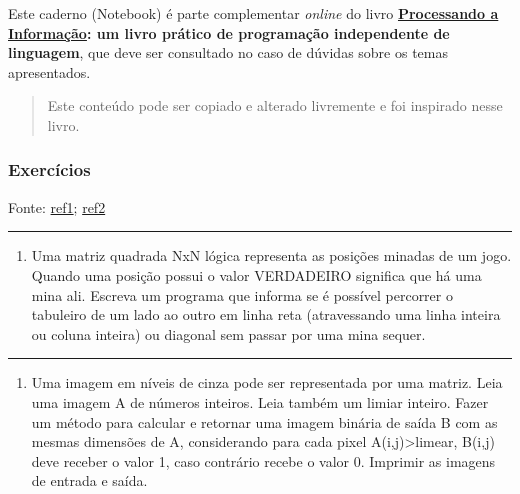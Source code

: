 \documentclass[12pt,a4paper]{article}
\providecommand{\tightlist}{%
      \setlength{\itemsep}{0pt}\setlength{\parskip}{0pt}}
\begin{document}
Este caderno (Notebook) é parte complementar \emph{online} do livro
\textbf{\href{https://editora.ufabc.edu.br/matematica-e-ciencias-da-computacao/58-processando-a-informacao}{Processando
a Informação}: um livro prático de programação independente de
linguagem}, que deve ser consultado no caso de dúvidas sobre os temas
apresentados.

\begin{quote}
Este conteúdo pode ser copiado e alterado livremente e foi inspirado
nesse livro.
\end{quote}

    \hypertarget{exercuxedcios}{%
\subsubsection{Exercícios}\label{exercuxedcios}}

Fonte:
\href{http://www.deinf.ufma.br/~csalles/prog/prog_lista2.pdf}{ref1};
\href{http://www.facom.ufu.br/~backes/wordpress/ListaC04.pdf}{ref2}

    \begin{center}\rule{0.5\linewidth}{0.5pt}\end{center}

\begin{enumerate}
\def\labelenumi{\arabic{enumi}.}
\tightlist
\item
  Uma matriz quadrada NxN lógica representa as posições minadas de um
  jogo. Quando uma posição possui o valor VERDADEIRO significa que há
  uma mina ali. Escreva um programa que informa se é possível percorrer
  o tabuleiro de um lado ao outro em linha reta (atravessando uma linha
  inteira ou coluna inteira) ou diagonal sem passar por uma mina sequer.
\end{enumerate}

    \begin{center}\rule{0.5\linewidth}{0.5pt}\end{center}

\begin{enumerate}
\def\labelenumi{\arabic{enumi}.}
\setcounter{enumi}{1}
\tightlist
\item
  Uma imagem em níveis de cinza pode ser representada por uma matriz.
  Leia uma imagem A de números inteiros. Leia também um limiar inteiro.
  Fazer um método para calcular e retornar uma imagem binária de saída B
  com as mesmas dimensões de A, considerando para cada pixel
  A(i,j)\textgreater limear, B(i,j) deve receber o valor 1, caso
  contrário recebe o valor 0. Imprimir as imagens de entrada e saída.
\end{enumerate}
\end{document}

